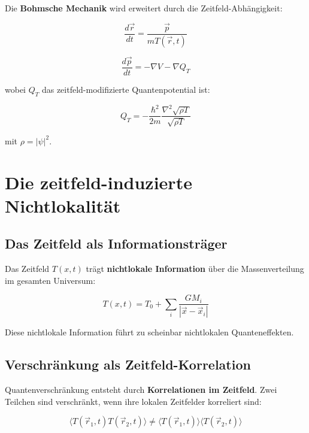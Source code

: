 \documentclass[12pt,a4paper]{report}
\begin{document}
	Die \textbf{Bohmsche Mechanik} wird erweitert durch die Zeitfeld-Abhängigkeit:
	
	\begin{equation}
		\frac{d\vec{r}}{dt} = \frac{\vec{p}}{m T(\vec{r},t)}
	\end{equation}
	
	\begin{equation}
		\frac{d\vec{p}}{dt} = -\nabla V - \nabla Q_T
	\end{equation}
	
	wobei $Q_T$ das zeitfeld-modifizierte Quantenpotential ist:
	
	\begin{equation}
		Q_T = -\frac{\hbar^2}{2m}\frac{\nabla^2\sqrt{\rho T}}{\sqrt{\rho T}}
	\end{equation}
	
	mit $\rho = |\psi|^2$.
	
	\section{Die zeitfeld-induzierte Nichtlokalität}
	
	\subsection{Das Zeitfeld als Informationsträger}
	
	Das Zeitfeld $T(x,t)$ trägt \textbf{nichtlokale Information} über die Massenverteilung im gesamten Universum:
	
	\begin{equation}
		T(x,t) = T_0 + \sum_i \frac{GM_i}{|\vec{x} - \vec{x}_i|}
	\end{equation}
	
	Diese nichtlokale Information führt zu scheinbar nichtlokalen Quanteneffekten.
	
	\subsection{Verschränkung als Zeitfeld-Korrelation}
	
	Quantenverschränkung entsteht durch \textbf{Korrelationen im Zeitfeld}. Zwei Teilchen sind verschränkt, wenn ihre lokalen Zeitfelder korreliert sind:
	
	\begin{equation}
		\langle T(\vec{r}_1,t) T(\vec{r}_2,t)\rangle \neq \langle T(\vec{r}_1,t)\rangle \langle T(\vec{r}_2,t)\rangle
	\end{equation}
	
\end{document}
